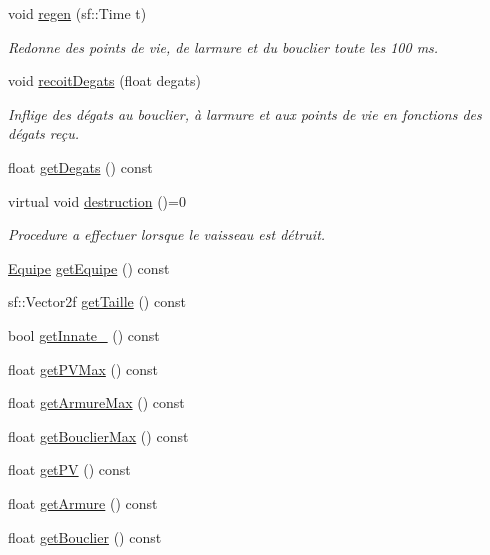 \begin{DoxyCompactItemize}
void \hyperlink{class_entite_ac45ceffbeb11cbae7dca26fde5865b85}{regen} (sf\+::\+Time t)
\begin{DoxyCompactList}\small\item\em Redonne des points de vie, de l\textquotesingle{}armure et du bouclier toute les 100 ms. \end{DoxyCompactList}\item 
void \hyperlink{class_entite_ab16c58f618b3b854310f92f044cc4a17}{recoit\+Degats} (float degats)
\begin{DoxyCompactList}\small\item\em Inflige des dégats au bouclier, à l\textquotesingle{}armure et aux points de vie en fonctions des dégats reçu. \end{DoxyCompactList}\item 
float \hyperlink{class_entite_a4e2706d31025034b76fb5aa6bc4f82a9}{get\+Degats} () const
\item 
virtual void \hyperlink{class_entite_af5c424f69b2c880ae9c12786abd28592}{destruction} ()=0
\begin{DoxyCompactList}\small\item\em Procedure a effectuer lorsque le vaisseau est détruit. \end{DoxyCompactList}\item 
\hyperlink{constantes_8h_a08fa5554288d5031a8f3bb83cc04ee83}{Equipe} \hyperlink{class_entite_a44612e23e1c45af3e865fa039875df1e}{get\+Equipe} () const
\item 
sf\+::\+Vector2f \hyperlink{class_entite_ac9ce99e4eb26bb9c4b9f2c8aaf3899c8}{get\+Taille} () const
\item 
bool \hyperlink{class_entite_af607aa77e0ce2f6afa3cf8fdd073b9cf}{get\+Innate\+\_\+} () const
\item 
float \hyperlink{class_entite_a474c3aad164255a66c0c9d39b6e4ed1f}{get\+P\+V\+Max} () const
\item 
float \hyperlink{class_entite_aa7c171ab62d923d8b6f2912851ac7b1d}{get\+Armure\+Max} () const
\item 
float \hyperlink{class_entite_adecf490f77d783aa9492eb833b307939}{get\+Bouclier\+Max} () const
\item 
float \hyperlink{class_entite_aa803a384c574a66d2b104fafd43f189a}{get\+PV} () const
\item 
float \hyperlink{class_entite_a06ac37b64ff428cd03ba0c935c101227}{get\+Armure} () const
\item 
float \hyperlink{class_entite_ae680682baaeab669956e9060fca74923}{get\+Bouclier} () const
\item 

\end{DoxyCompactItemize}
